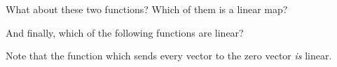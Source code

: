 \documentclass{ximera}
\begin{document}
\begin{question}
  What about these two functions?  Which of them is a linear map?
  \begin{solution}
    \begin{multiple-choice}
    \end{multiple-choice}
  \end{solution}

  And finally, which of the following functions are linear?
  \begin{solution}
    \begin{multiple-choice}
    \end{multiple-choice}
  \end{solution}

  \begin{warning}
    Note that the function which sends every vector to the zero vector
    \textit{is} linear.
  \end{warning}
\end{question}
	
\end{document}
